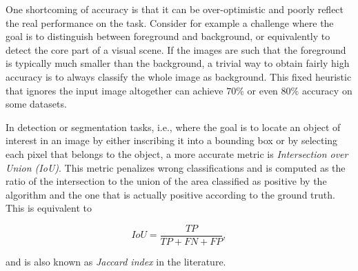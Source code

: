 One shortcoming of accuracy is that it can be over-optimistic and poorly
reflect the real performance on the task. Consider for example a challenge
where the goal is to distinguish between foreground and background, or
equivalently to detect the core part of a visual scene. If the images are such
that the foreground is typically much smaller than the background, a trivial
way to obtain fairly high accuracy is to always classify the whole image as
background. This fixed heuristic that ignores the input image altogether can
achieve $70\%$ or even $80\%$ accuracy on some datasets.

In detection or segmentation tasks, i.e., where the goal is to locate an object
of interest in an image by either inscribing it into a bounding box or by
selecting each pixel that belongs to the object, a more accurate metric is
\emph{Intersection over Union (IoU)}. This metric penalizes wrong
classifications and is computed as the ratio of the intersection to the union
of the area classified as positive by the algorithm and the one that is
actually positive according to the ground truth. This is equivalent to

\begin{equation}\label{eq:iou}
    IoU = \frac{TP}{TP + FN + FP},
\end{equation}

\noindent and is also known as \emph{Jaccard index} in the literature.

